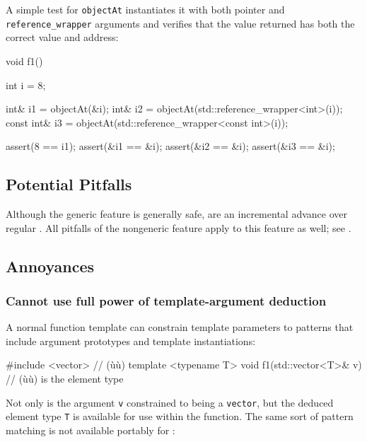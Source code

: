 {A simple test for \lstinline!objectAt! instantiates it with both pointer
and \lstinline!reference_wrapper! arguments and verifies that the value
returned has both the correct value and address:

\begin{emcppslisting}
void f1()
{
    int i = 8;

    int&       i1 = objectAt(&i);
    int&       i2 = objectAt(std::reference_wrapper<int>(i));
    const int& i3 = objectAt(std::reference_wrapper<const int>(i));

    assert(8 == i1);
    assert(&i1 == &i);
    assert(&i2 == &i);
    assert(&i3 == &i);
}
\end{emcppslisting}
    

\subsection[Potential Pitfalls]{Potential Pitfalls}\label{potential-pitfalls}

Although the generic feature is generally safe, 
are an incremental advance over regular . All
pitfalls of the nongeneric feature apply to this feature as well; see
.

\subsection[Annoyances]{Annoyances}\label{annoyances}

\subsubsection[Cannot use full power of template-argument deduction]{Cannot use full power of template-argument deduction}\label{cannot-use-full-power-of-template-argument-deduction}

A normal function template can constrain template parameters to patterns
that include argument prototypes and template instantiations:

\begin{emcppslisting}
#include <vector>  // (ù{}ù)
template <typename T> void f1(std::vector<T>& v) { }  // (ù{}ù) is the element type
\end{emcppslisting}
    

\noindent Not only is the argument \lstinline!v! constrained to being a
\lstinline!vector!, but the deduced element type \lstinline!T! is available
for use within the function. The same sort of pattern matching is not
available portably for :

}

